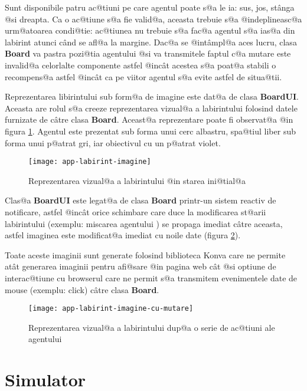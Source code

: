 Sunt disponibile patru ac@tiuni pe care agentul poate s@a le ia: sus, jos, st\^ anga @si dreapta. Ca o ac@tiune s@a fie valid@a, aceasta trebuie s@a @indeplineasc@a urm@atoarea condi@tie: ac@tiunea nu trebuie s@a fac@a agentul s@a ias@a din labirint atunci c\^ and se afl@a la margine. Dac@a se @int\^ ampl@a aces lucru, clasa {\bf Board} va pastra pozi@tia agentului @si va transmitele faptul c@a mutare este invalid@a celorlalte componente astfel @inc\^ at acestea s@a poat@a stabili o recompens@a astfel @inc\^ at ca pe viitor agentul s@a evite astfel de situa@tii.

Reprezentarea libirintului sub form@a de imagine este dat@a de clasa \textbf{BoardUI}. Aceasta are rolul s@a creeze reprezentarea vizual@a a labirintului folosind datele furnizate de c\^ atre clasa \textbf{Board}. Aceast@a reprezentare poate fi observat@a @in figura \ref{fig:labirint-imagine}. Agentul este prezentat sub forma unui cerc albastru, spa@tiul liber sub forma unui p@atrat gri, iar obiectivul cu un p@atrat violet.

\begin{figure}[h]
	\centering
	\texttt{[image: app-labirint-imagine]}
	\caption{Reprezentarea vizual@a a labirintului @in starea ini@tial@a}
	\label{fig:labirint-imagine}
\end{figure}

Clas@a \textbf{BoardUI} este legat@a de clasa \textbf{Board} printr-un sistem reactiv de notificare, astfel @inc\^ at orice schimbare care duce la modificarea st@arii labirintului (exemplu: miscarea agentului ) se propaga imediat c\^ atre aceasta, astfel imaginea este modificat@a imediat cu noile date (figura \ref{fig:labirint-imagine-cu-mutare}).

Toate aceste imaginii sunt generate folosind biblioteca Konva care ne permite at\^ at generarea imaginii pentru afi@sare @in pagina web c\^ at @si optiune de interac@tiune cu browserul care ne permit s@a transmitem evenimentele date de mouse (exemplu: click) c\^ atre clasa \textbf{Board}.

\begin{figure}[h]
	\centering
	\texttt{[image: app-labirint-imagine-cu-mutare]}
	\caption{Reprezentarea vizual@a a labirintului dup@a o serie de ac@tiuni ale agentului}
	\label{fig:labirint-imagine-cu-mutare}
\end{figure}


\section{Simulator}

